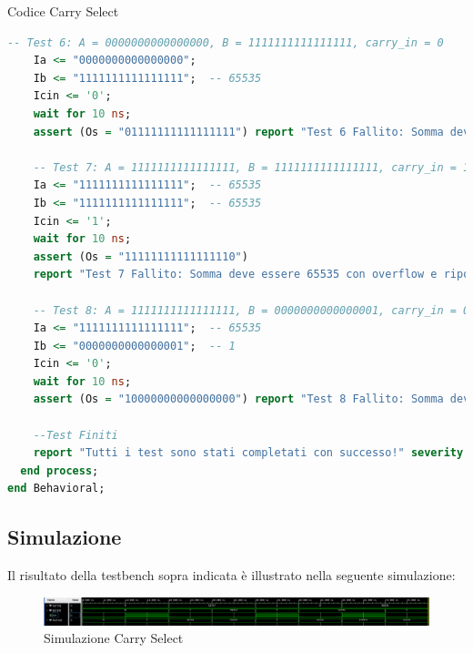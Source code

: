 \begin{problem}{Codice Carry Select}{}
\begin{lstlisting}[language=VHDL]
    -- Test 6: A = 0000000000000000, B = 1111111111111111, carry_in = 0
    Ia <= "0000000000000000"; 
    Ib <= "1111111111111111";  -- 65535
    Icin <= '0';
    wait for 10 ns;
    assert (Os = "01111111111111111") report "Test 6 Fallito: Somma deve essere 65535." severity error;

    -- Test 7: A = 1111111111111111, B = 1111111111111111, carry_in = 1
    Ia <= "1111111111111111";  -- 65535
    Ib <= "1111111111111111";  -- 65535
    Icin <= '1';
    wait for 10 ns;
    assert (Os = "11111111111111110") 
    report "Test 7 Fallito: Somma deve essere 65535 con overflow e riporto." severity error;

    -- Test 8: A = 1111111111111111, B = 0000000000000001, carry_in = 0
    Ia <= "1111111111111111";  -- 65535
    Ib <= "0000000000000001";  -- 1
    Icin <= '0';
    wait for 10 ns;
    assert (Os = "10000000000000000") report "Test 8 Fallito: Somma deve essere 0 (overflow)." severity error;

    --Test Finiti
    report "Tutti i test sono stati completati con successo!" severity note;
  end process;
end Behavioral;
\end{lstlisting}
\end{problem}
\subsection{Simulazione}
Il risultato della testbench sopra indicata è illustrato nella seguente simulazione:
\begin{figure}[h]
    \centering
    \includegraphics[width=16cm]{resources/carry_select_sim.png}
    \caption{Simulazione Carry Select}
    \label{fig:simulation_carryselect}
\end{figure}
